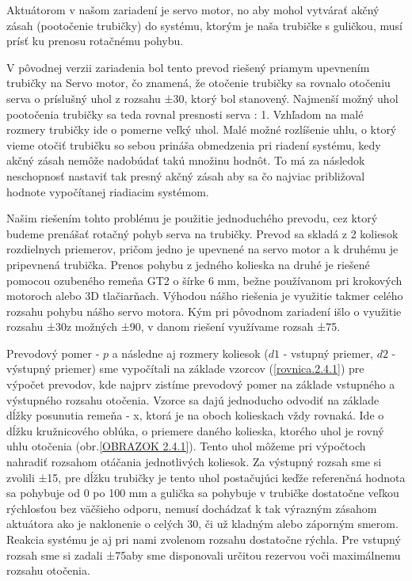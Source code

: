 Aktuátorom v našom zariadení je servo motor, no aby mohol vytvárať akčný zásah (pootočenie trubičky) do systému, ktorým je naša trubičke s guličkou, musí prísť ku prenosu rotačnému pohybu.
 
V pôvodnej verzii zariadenia bol tento prevod riešený priamym upevnením trubičky na Servo motor, čo znamená, že otočenie trubičky sa rovnalo otočeniu serva o príslušný uhol z rozsahu ±30\textdegree, ktorý bol stanovený. Najmenší možný uhol pootočenia trubičky sa teda rovnal presnosti serva : 1\textdegree. Vzhľadom na malé rozmery trubičky ide o pomerne veľký uhol. Malé možné rozlíšenie uhlu, o ktorý vieme otočiť trubičku so sebou prináša obmedzenia pri riadení systému, kedy akčný zásah nemôže nadobúdať takú množinu hodnôt. To má za následok neschopnosť nastaviť tak presný akčný zásah aby sa čo najviac približoval hodnote vypočítanej riadiacim systémom. 

Našim riešením tohto problému je použitie jednoduchého prevodu, cez ktorý budeme prenášať rotačný pohyb serva na trubičky. Prevod sa skladá z 2 koliesok rozdielnych priemerov, pričom jedno je upevnené na servo motor a k druhému je pripevnená trubička. Prenos pohybu z jedného kolieska na druhé je riešené pomocou ozubeného remeňa GT2 o šírke 6 mm, bežne používanom pri krokových motoroch alebo 3D tlačiarňach. Výhodou nášho riešenia je využitie takmer celého rozsahu pohybu nášho servo motora. Kým pri pôvodnom zariadení išlo o využitie rozsahu ±30\textdegree z možných ±90\textdegree,  v danom riešení využívame rozsah ±75\textdegree.

Prevodový pomer - $p$ a následne aj rozmery koliesok ($d1$ - vstupný priemer, $d2$ - výstupný priemer) sme vypočítali na základe vzorcov (\ref{rovnica.2.4.1}) pre výpočet prevodov, kde najprv zistíme prevodový pomer na základe vstupného a výstupného rozsahu otočenia. Vzorce sa dajú jednoducho odvodiť na základe dĺžky posunutia remeňa - x, ktorá je na oboch kolieskach vždy rovnaká. Ide o dĺžku kružnicového oblúka, o priemere daného kolieska, ktorého uhol je rovný uhlu otočenia (obr.\ref{OBRAZOK 2.4.1}). Tento uhol môžeme pri výpočtoch nahradiť rozsahom otáčania jednotlivých koliesok.  Za výstupný rozsah sme si zvolili ±15\textdegree, pre dĺžku trubičky je tento uhol postačujúci keďže referenčná hodnota sa pohybuje od 0 po 100 mm a gulička sa pohybuje v trubičke dostatočne veľkou rýchlosťou bez väčšieho odporu, nemusí dochádzať k tak výrazným zásahom aktuátora ako je naklonenie o celých 30\textdegree, či už kladným alebo záporným smerom.  Reakcia systému je aj pri nami zvolenom rozsahu dostatočne rýchla. Pre vstupný rozsah sme si zadali ±75\textdegree aby sme disponovali určitou rezervou voči maximálnemu rozsahu otočenia.



